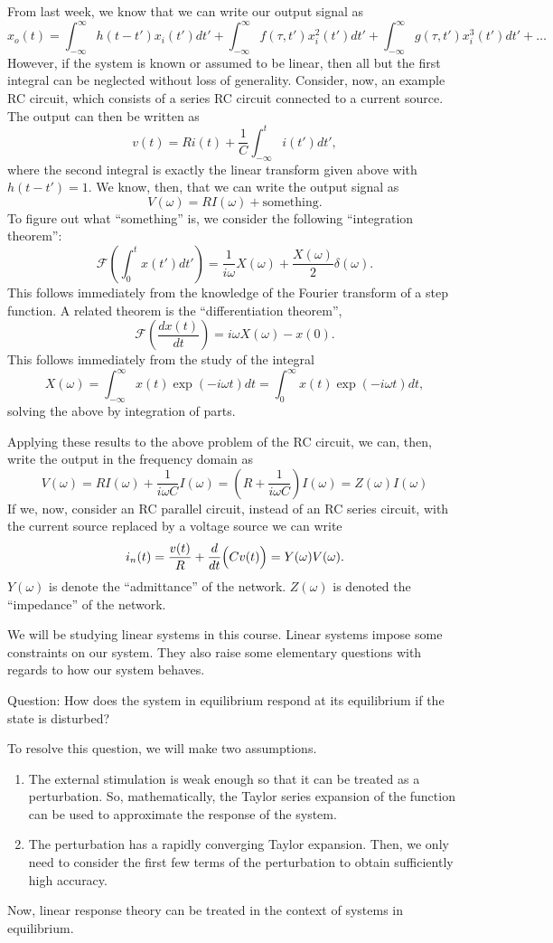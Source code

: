 \documentclass{article}
\begin{document}
From last week, we know that we can write our output signal as
\[
   x_{o}(t) = \int_{-\infty}^{\infty} h(t-t')x_{i}(t') dt' +
   \int_{-\infty}^{\infty} f(\tau,t') x^{2}_{i}(t') dt' +
   \int_{-\infty}^{\infty} g(\tau,t') x^{3}_{i}(t') dt' + \ldots
\]
However, if the system is known or assumed to be linear, then all but the first
integral can be neglected without loss of generality. Consider, now, an example
RC circuit, which consists of a series RC circuit connected to a current source.
The output can then be written as
\[
   v(t) = R i(t) + \frac{1}{C} \int_{-\infty}^{t}i(t')dt',
\]
where the second integral is exactly the linear transform given above with $
h(t-t') = 1 $. We know,
then, that we can write the output signal as
\[
   V(\omega) = R I(\omega) + \text{something}.
\]
To figure out what ``something'' is, we consider the following ``integration
theorem'':
\[
   \mathcal{F}\left( \int_{0}^{t} x(t') dt' \right)
   = \frac{1}{i\omega}X(\omega) + \frac{X(\omega)}{2} \delta(\omega).
\]
This follows immediately from the knowledge of the Fourier transform of a step
function. A related theorem is the ``differentiation theorem'',
\[
   \mathcal{F}(\frac{d x(t)}{dt}) = i\omega X(\omega) - x(0).
\]
This follows immediately from the study of the integral
\[
   X(\omega) = \int_{-\infty}^{\infty}x(t) \exp(-i \omega t) dt
   = \int_{0}^{\infty} x(t) \exp(-i \omega t) dt,
\]
solving the above by integration of parts.

Applying these results to the above problem of the RC circuit, we can, then,
write the output in the frequency domain as
\[
   V(\omega) = R I(\omega) + \frac{1}{i \omega C} I(\omega) =
   \left( R + \frac{1}{i \omega C} \right) I(\omega) = Z(\omega) I(\omega)
\]
If we, now, consider an RC parallel circuit, instead of an RC series circuit,
with the current source replaced by a voltage source we can write
\[
   i_{n}(t)
   = \frac{v(t)}{R} + \frac{d}{dt}\Bigl( C v(t) \Bigr)
   = Y(\omega) V(\omega).
\]
$ Y(\omega) $ is denote the ``admittance'' of the network. $ Z(\omega) $ is
denoted the ``impedance'' of the network.

We will be studying linear systems in this course. Linear systems impose some
constraints on our system. They also raise some elementary questions with
regards to how our system behaves.

Question: How does the system in equilibrium respond at its
equilibrium if the state is disturbed?

To resolve this question, we will make two assumptions.
\begin{enumerate}
   \item The external stimulation is weak enough so that it can be treated as a
      perturbation. So, mathematically, the Taylor series expansion of the
      function can be used to approximate the response of the system.
   \item The perturbation has a rapidly converging Taylor expansion. Then, we
      only need to consider the first few terms  of the perturbation to obtain
      sufficiently high accuracy.
\end{enumerate}
Now, linear response theory can be treated in the context of systems in
equilibrium.
\end{document}
